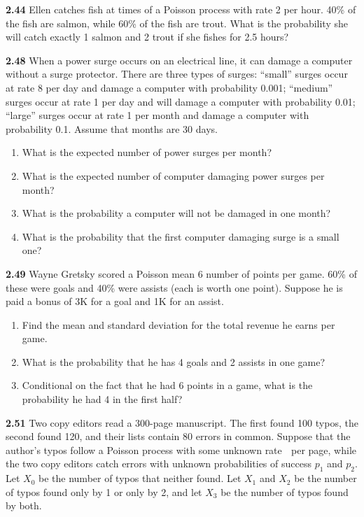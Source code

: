\documentclass[12pt]{article}
\begin{document}
\vspace{1\baselineskip}
{\bf 2.44 }Ellen catches fish at times of a Poisson process with rate 2 per hour. 40\% of the fish are salmon, while 60\% of the fish are trout. What is the probability she will catch exactly 1 salmon and 2 trout if she fishes for 2.5 hours?

\vspace{1\baselineskip}
{\bf 2.48 } When a power surge occurs on an electrical line, it can damage a computer without a surge protector. There are three types of surges: “small” surges occur at rate 8 per day and damage a computer with probability 0.001; “medium” surges occur at rate 1 per day and will damage a computer with probability 0.01; “large” surges occur at rate 1 per month and damage a computer with probability 0.1. Assume that months are 30 days.
\begin{enumerate}[label=(\alph*)]
    \item What is the expected number of power surges per month?
    \item What is the expected number of computer damaging power surges per month?
    \item What is the probability a computer will not be damaged in one month?
    \item What is the probability that the first computer damaging surge is a small one?
\end{enumerate}

{\bf 2.49 }Wayne Gretsky scored a Poisson mean 6 number of points per game. 60\% of these were goals and 40\% were assists (each is worth one point). Suppose he is paid a bonus of 3K for a goal and 1K for an assist.
\begin{enumerate}[label=(\alph*)]
    \item Find the mean and standard deviation for the total revenue he earns per game.
    \item What is the probability that he has 4 goals and 2 assists in one game?
    \item Conditional on the fact that he had 6 points in a game, what is the probability he had 4 in the first half?
\end{enumerate}

{\bf 2.51 }Two copy editors read a 300-page manuscript. The first found 100 typos, the second found 120, and their lists contain 80 errors in common. Suppose that the author’s typos follow a Poisson process with some unknown rate  per page, while the two copy editors catch errors with unknown probabilities of success $p_1$ and $p_2$. Let $X_0$ be the number of typos that neither found. Let $X_1$ and $X_2$ be the number of typos found only by 1 or only by 2, and let $X_3$ be the number of typos found by both.
\end{document}
